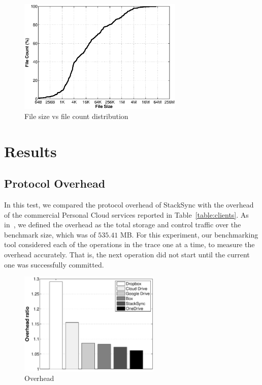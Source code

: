\begin{figure}[t]
  \centering
  \includegraphics[width=0.7\textwidth]{figures/cdf_files}
  \caption{File size vs file count distribution}
  \label{fig:cdf_files}
\end{figure}

\section{Results}

\subsection{Protocol Overhead}
In this test, we compared the protocol overhead of StackSync with the overhead of the
commercial Personal Cloud services reported in Table~\ref{table:clients}. As in~\cite{drago2013benchmarking},
we defined the overhead as the total storage and control traffic over the benchmark size, which was of 
$535.41$ MB. For this experiment, our benchmarking tool considered each of the operations in the trace one at a time,
to measure the overhead accurately. That is, the next operation did not start until the current one was
successfully committed.

\begin{figure}[h]
  \centering
  \label{fig:overhead_clients}
  \includegraphics[width=0.6\textwidth]{figures/overhead_clients}
  \caption{Overhead}
\end{figure}

